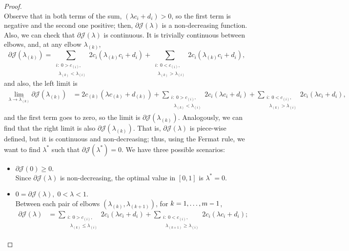 \begin{proof}
\begin{equation}
    \end{equation}
    Observe that in both terms of the sum, $(\lambda c_i + d_i) > 0$, so the first term is negative and the second one positive; then, $\partial \mathcal{J}(\lambda)$ is a non-decreasing function.
    Also, we can check that $\partial \mathcal{J}(\lambda)$ is continuous. It is trivially continuous between elbows, and, at any elbow $\lambda_{(k)}$, 
    $$
    \partial \mathcal{J}(\lambda_{(k)}) =  \sum_{\substack{i:\; 0 > c_{(i)},\\ \;\; \lambda_{(k)} < \lambda_{(i)}}} {2 c_i (\lambda_{(k)} c_i + d_i)} + \sum_{\substack{i:\; 0 < c_{(i)},\\ \;\; \lambda_{(k)} > \lambda_{(i)}}} {2 c_i (\lambda_{(k)} c_i + d_i)}  ,
    $$
    and also, the left limit is 
    \begin{align*}
        \lim_{\lambda \to \lambda_{(k)}^{-}} \partial \mathcal{J}(\lambda_{(k)}) &= 
        2c_{(k)} (\lambda c_{(k)} + d_{(k)})  + 
        \sum_{\substack{i:\; 0 > c_{(i)},\\ \;\; \lambda_{(k)} < \lambda_{(i)}}} {2 c_i (\lambda c_i + d_i)} + \sum_{\substack{i:\; 0 < c_{(i)} ,\\ \;\; \lambda_{(k)} > \lambda_{(i)}}} {2 c_i (\lambda c_i + d_i)},
    \end{align*}
    and the first term goes to zero, so the limit is $\partial \mathcal{J}(\lambda_{(k)})$. Analogously, we can find that the right limit is also $\partial \mathcal{J}(\lambda_{(k)})$.    
    That is, $\partial \mathcal{J}(\lambda)$ is piece-wise defined, but it is continuous and non-decreasing; thus, using the Fermat rule, we want to find $\lambda^*$ such that $\partial \mathcal{J}(\lambda^*) = 0$. We have three possible scenarios:
    \begin{itemize}
        \item $\partial \mathcal{J}(0) \geq 0.$ 
        \\Since $\partial \mathcal{J}(\lambda)$ is non-decreasing, the optimal value in $[0, 1]$ is $\lambda^* = 0$.
        \item $0 = \partial \mathcal{J}(\lambda), \; 0 < \lambda < 1$. 
        \\ Between each pair of elbows $(\lambda_{(k)}, \lambda_{(k+1)})$, for $k=1,  \dots, m-1$, 
        \begin{equation}\nonumber
            \begin{aligned}
                \partial \mathcal{J}(\lambda) &=  \sum_{\substack{i:\; 0 > c_{(i)},\\ \;\; \lambda_{(k)} \leq \lambda_{(i)}}} {2 c_i (\lambda c_i + d_i)} + \sum_{\substack{i:\; 0 < c_{(i)},\\ \;\; \lambda_{(k+1)} \geq \lambda_{(i)}}} {2 c_i (\lambda c_i + d_i)}  ;

\end{aligned}
\end{equation}
\end{itemize}
\end{proof}
